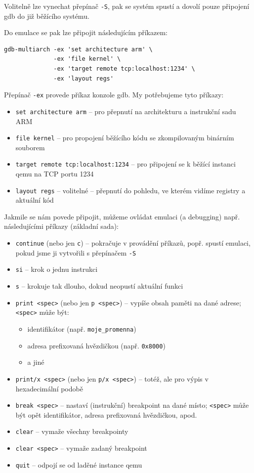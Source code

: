 \documentclass{article}
\begin{document}
Volitelně lze vynechat přepínač {\tt -S}, pak se systém spustí a dovolí pouze připojení gdb do již běžícího systému.

Do emulace se pak lze připojit následujícím příkazem:
\begin{verbatim}
gdb-multiarch -ex 'set architecture arm' \
              -ex 'file kernel' \
              -ex 'target remote tcp:localhost:1234' \
              -ex 'layout regs'
\end{verbatim}

Přepínač {\tt -ex} provede příkaz konzole gdb. My potřebujeme tyto příkazy:
\begin{itemize}
	\item {\tt set architecture arm} -- pro přepnutí na architekturu a instrukční sadu ARM
	\item {\tt file kernel} -- pro propojení běžícího kódu se zkompilovaným binárním souborem
	\item {\tt target remote tcp:localhost:1234} -- pro připojení se k běžící instanci qemu na TCP portu 1234
	\item {\tt layout regs} -- volitelné -- přepnutí do pohledu, ve kterém vidíme registry a aktuální kód
\end{itemize}

Jakmile se nám povede připojit, můžeme ovládat emulaci (a debugging) např. následujícími příkazy (základní sada):

\begin{itemize}
	\item {\tt continue} (nebo jen {\tt c}) -- pokračuje v provádění příkazů, popř. spustí emulaci, pokud jsme ji vytvořili s přepínačem {\tt -S}
	\item {\tt si} -- krok o jednu instrukci
	\item {\tt s} -- krokuje tak dlouho, dokud neopustí aktuální funkci
	\item {\tt print <spec>} (nebo jen {\tt p <spec>}) -- vypíše obsah paměti na dané adrese; {\tt <spec>} může být:
		\begin{itemize}
			\item identifikátor (např. {\tt moje\_promenna})
			\item adresa prefixovaná hvězdičkou (např. {\tt *0x8000})
			\item a jiné
		\end{itemize}
	\item {\tt print/x <spec>} (nebo jen {\tt p/x <spec>}) -- totéž, ale pro výpis v hexadecimální podobě
	\item {\tt break <spec>} -- nastaví (instrukční) breakpoint na dané místo; {\tt <spec>} může být opět identifikátor, adresa prefixovaná hvězdičkou, apod.
	\item {\tt clear} -- vymaže všechny breakpointy
	\item {\tt clear <spec>} -- vymaže zadaný breakpoint
	\item {\tt quit} -- odpojí se od laděné instance qemu
\end{itemize}
\end{document}

